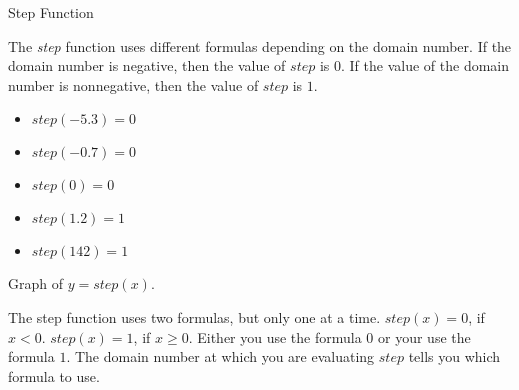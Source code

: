 \documentclass{ximera}
\begin{document}
\begin{example} Step Function


The \textit{step} function uses different formulas depending on the domain number.  If the domain number is negative, then the value of $step$ is $0$. If the value of the domain number is nonnegative, then the value of $step$ is $1$.



\begin{itemize}
\item $step(-5.3) = 0$
\item $step(-0.7) = 0$
\item $step(0) = 0$
\item $step(1.2) = 1$
\item $step(142) = 1$
\end{itemize}



Graph of $y = step(x)$.
\begin{image}
\end{image}


\end{example}





The step function uses two formulas, but only one at a time.  $step(x) = 0$, if $x < 0$. $step(x) = 1$, if $x \geq 0$.  Either you use the formula $0$ or your use the formula $1$.  The domain number at which you are evaluating $step$ tells you which formula to use.
\end{document}
